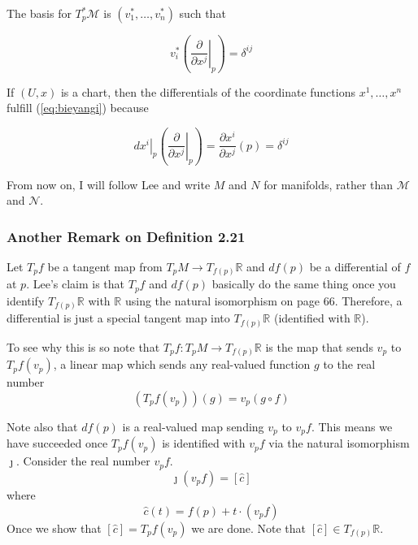 \documentclass[12pt]{article}
\begin{document}
The basis for $T_{p}^{\ast}\mathcal{M}$ is
$(v_{1}^{\ast},\ldots,v_{n}^{\ast})$ such that 

\begin{equation}
  \label{eq:bieyangi}
  v_{i}^{\ast}\left(\left.\frac{\partial}{\partial{}x^{j}}\right\vert_{p}\right)=\delta^{ij}
\end{equation}

If $(U,x)$ is a chart, then the differentials of the coordinate
functions $x^{1},\ldots,x^{n}$ fulfill (\ref{eq:bieyangi}) because

\begin{equation}
  \label{eq:yooxieta}
  \left.dx^{i}\right\vert_{p}\left(\left.\frac{\partial}{\partial{}x^{j}}\right\vert_{p}\right)=\frac{\partial{}x^{i}}{\partial{}x^{j}}(p)=\delta^{ij}
\end{equation}

From now on, I will follow Lee and write $M$ and $N$ for manifolds,
rather than $\mathcal{M}$ and $\mathcal{N}$.

\subsubsection{Another Remark on Definition 2.21}
\label{subsubsection:doopifae}

Let $T_{p}f$ be a tangent map from
$T_{p}M\rightarrow{}T_{f(p)}\mathbb{R}$ and $df(p)$ be a differential
of $f$ at $p$. Lee's claim is that $T_{p}f$ and $df(p)$ basically do
the same thing once you identify $T_{f(p)}\mathbb{R}$ with
$\mathbb{R}$ using the natural isomorphism on page 66. Therefore, a
differential is just a special tangent map into $T_{f(p)}\mathbb{R}$
(identified with $\mathbb{R}$). 

To see why this is so note that
$T_{p}f:T_{p}M\rightarrow{}T_{f(p)}\mathbb{R}$ is the map that sends
$v_{p}$ to $T_{p}f(v_{p})$, a linear map which sends any real-valued
function $g$ to the real number
\begin{equation}
  \label{eq:ugaiwoon}
  (T_{p}f(v_{p}))(g)=v_{p}(g\circ{}f)
\end{equation}

Note also that $df(p)$ is a real-valued map sending $v_{p}$ to
$v_{p}f$. This means we have succeeded once $T_{p}f(v_{p})$ is
identified with $v_{p}f$ via the natural isomorphism $\jmath$. Consider the
real number $v_{p}f$. 
\begin{equation}
  \label{eq:aezuroti}
  \jmath(v_{p}f)=[\hat{c}]
\end{equation}
where
\begin{equation}
  \label{eq:aecoocha}
  \hat{c}(t)=f(p)+t\cdot(v_{p}f)
\end{equation}
Once we show that $[\hat{c}]=T_{p}f(v_{p})$ we are done. Note that
$[\hat{c}]\in{}T_{f(p)}\mathbb{R}$.
\end{document}
